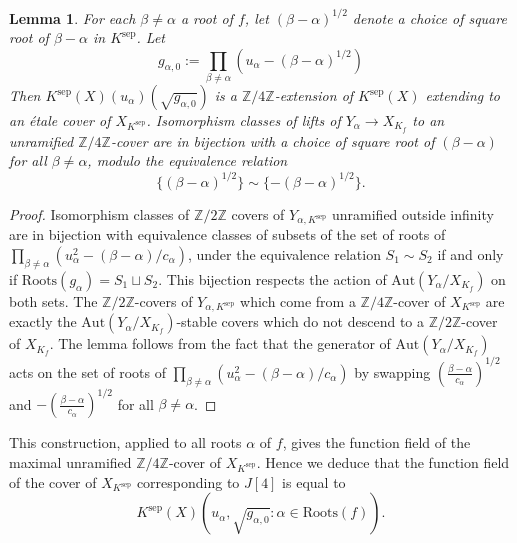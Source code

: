 \documentclass[11pt]{amsart}
\def\Aut{\mathrm{Aut}}
\theoremstyle{plain}
\newtheorem{lemma}{Lemma}
\theoremstyle{definition}
\newcommand{\Roots}{\mathrm{Roots}}
\newcommand{\sep}{\mathrm{sep}}
\begin{document}
\begin{lemma}\label{lemma:Z4Zcovers}
For each $\beta \neq \alpha $ a root of $f$, let $(\beta -\alpha )^{1/2}$ denote a choice of square root of $\beta -\alpha $ in $K^{\sep }$. Let
\[
g_{\alpha ,0}:=\prod _{\beta \neq \alpha }(u_{\alpha }-(\beta -\alpha )^{1/2})
\] 
Then $K^{\sep }(X)(u_{\alpha })(\sqrt{g_{\alpha ,0}})$ is a $\mathbb{Z}/4\mathbb{Z}$-extension of $K^{\sep }(X)$ extending to an \'etale cover of $X_{K^{\sep }}$. Isomorphism classes of lifts of $Y_{\alpha}\to X_{K_f }$ to an unramified $\mathbb{Z}/4\mathbb{Z}$-cover are in bijection with a choice of square root of $(\beta -\alpha )$ for all $\beta \neq \alpha $, modulo the equivalence relation
\[
\{ (\beta -\alpha )^{1/2}\}\sim \{ - (\beta -\alpha )^{1/2} \}.
\]
\end{lemma}
\begin{proof}
Isomorphism classes of $\mathbb{Z}/2\mathbb{Z}$ covers of $Y_{\alpha ,K^{\sep }}$ unramified outside infinity are in bijection with equivalence classes of subsets of the set of roots of $\prod _{\beta \neq \alpha }(u_{\alpha }^2 -(\beta -\alpha )/c_{\alpha })$, under the equivalence relation $S_1 \sim S_2 $ if and only if $\Roots (g_{\alpha })=S_1 \sqcup S_2 $. This bijection respects the action of $\Aut (Y_{\alpha }/X_{K_f })$ on both sets. The $\mathbb{Z}/2\mathbb{Z}$-covers of $Y_{\alpha ,K^{\sep }}$ which come from a $\mathbb{Z}/4\mathbb{Z}$-cover of $X_{K^{\sep }}$ are exactly the $\Aut (Y_{\alpha }/X_{K_f })$-stable covers which do not descend to a $\mathbb{Z}/2\mathbb{Z}$-cover of $X_{K_f }$. The lemma follows from the fact that the generator of $\Aut (Y_{\alpha }/X_{K_f })$ acts on the set of roots of $\prod _{\beta \neq \alpha }(u_{\alpha }^2 -(\beta -\alpha )/c_{\alpha })$ by swapping $(\frac{\beta -\alpha }{c_{\alpha }})^{1/2}$ and $-(\frac{\beta -\alpha }{c_{\alpha }})^{1/2}$ for all $\beta \neq \alpha $.

\end{proof}
This construction, applied to all roots $\alpha $ of $f$, gives the function field of the maximal unramified $\mathbb{Z}/4\mathbb{Z}$-cover of $X_{K^{\sep }}$. Hence we deduce that the function field of the cover of $X_{K^{\sep }}$ corresponding to $J[4]$ is equal to 
\[
K^{\sep }(X)(u_{\alpha },\sqrt{g_{\alpha ,0}}:\alpha \in \Roots (f)).
\]
\end{document}
